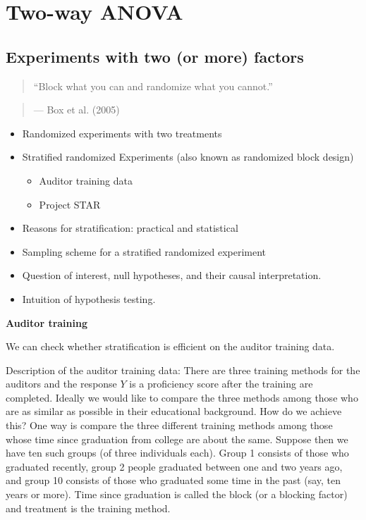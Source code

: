 \documentclass[12pt,]{book}
\providecommand{\tightlist}{%
  \setlength{\itemsep}{0pt}\setlength{\parskip}{0pt}}
\begin{document}
\chapter{Two-way ANOVA}\label{ch:anovaII}

\section{Experiments with two (or more)
factors}\label{experiments-with-two-or-more-factors}

\begin{quote}
``Block what you can and randomize what you cannot.''
\end{quote}

\begin{quote}
--- Box et al. (2005)
\end{quote}

\begin{itemize}
\tightlist
\item
  Randomized experiments with two treatments
\item
  Stratified randomized Experiments (also known as randomized block
  design)

  \begin{itemize}
  \tightlist
  \item
    Auditor training data
  \item
    Project STAR
  \end{itemize}
\item
  Reasons for stratification: practical and statistical
\item
  Sampling scheme for a stratified randomized experiment
\item
  Question of interest, null hypotheses, and their causal
  interpretation.
\item
  Intuition of hypothesis testing.
\end{itemize}

\textbf{Auditor training}

We can check whether stratification is efficient on the auditor training
data.

Description of the auditor training data: There are three training
methods for the auditors and the response \(Y\) is a proficiency score
after the training are completed. Ideally we would like to compare the
three methods among those who are as similar as possible in their
educational background. How do we achieve this? One way is compare the
three different training methods among those whose time since graduation
from college are about the same. Suppose then we have ten such groups
(of three individuals each). Group 1 consists of those who graduated
recently, group 2 people graduated between one and two years ago, and
group 10 consists of those who graduated some time in the past (say, ten
years or more). Time since graduation is called the block (or a blocking
factor) and treatment is the training method.
\end{document}
